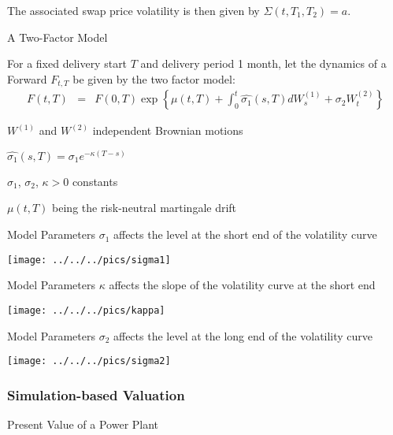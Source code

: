 The associated swap price volatility is then given by $\Sigma(t,T_1,T_2)=a$.

{A Two-Factor Model}






	For a fixed delivery start $T$ and delivery period 1 month, let the dynamics of a Forward $F_{t,T}$ be given by the two factor model:
\begin{eqnarray*}
F(t,T)& =&F(0,T)\exp\left\{\mu(t,T)  +\int_0^t\hat{\sigma_1}(s,T)dW_s^{(1)}+\sigma_2W_t^{(2)}\right\}
\end{eqnarray*}



	$W^{(1)}$ and $W^{(2)}$ independent Brownian motions


	$\hat{\sigma_1}(s,T)=\sigma_1e^{-\kappa(T-s)}$


	$\sigma_1$, $\sigma_2$, $\kappa>0$ constants


	$\mu(t,T)$ being the risk-neutral martingale drift





{Model Parameters}
$\sigma_1$ affects the level at the short end of the volatility curve

\begin{center}
\texttt{[image: ../../../pics/sigma1]}
\end{center}

{Model Parameters}
$\kappa$ affects the slope of the volatility curve at the short end

\begin{center}
\texttt{[image: ../../../pics/kappa]}
\end{center}

{Model Parameters}
$\sigma_2$ affects the level at the long end of the volatility curve

\begin{center}
\texttt{[image: ../../../pics/sigma2]}
\end{center}

\subsubsection{Simulation-based Valuation}

{Present Value of a Power Plant}






